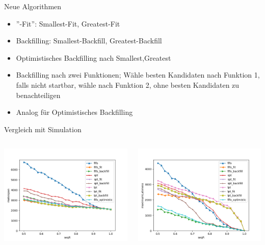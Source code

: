 \documentclass[aspectratio=169,10pt]{beamer}
\begin{document}
\begin{frame}[t, fragile]{Neue Algorithmen}
\begin{itemize}
	\item ''-Fit'': Smallest-Fit, Greatest-Fit
	\item Backfilling: Smallest-Backfill, Greatest-Backfill
	\item Optimistisches Backfilling nach Smallest,Greatest
	\item Backfilling nach zwei Funktionen; W\"ahle besten Kandidaten nach Funktion 1, falls nicht startbar, w\"ahle nach Funktion 2, ohne besten Kandidaten zu benachteiligen
	\item Analog f\"ur Optimistisches Backfilling
\end{itemize}
\end{frame}
\begin{frame}[t, fragile]{Vergleich mit Simulation}
	\begin{columns}
		\begin{column}{0.5\paperwidth}
			\vspace{0.5pt}
			\includegraphics[width=\linewidth, clip]{images/Figure_5_1}
		\end{column}
		\begin{column}[c]{0.5\paperwidth}
			\includegraphics[width=\linewidth, clip]{images/Figure_5_2}

\end{column}
\end{columns}
\end{frame}
\end{document}
